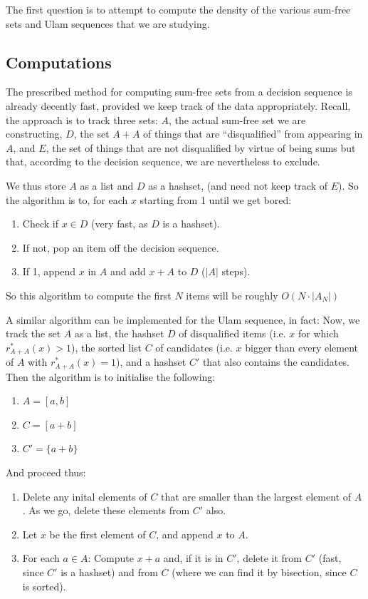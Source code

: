\documentclass{report}
\theoremstyle{remark}
\numberwithin{equation}{section}
\begin{document}
The first question is to attempt to compute the density of the various
sum-free sets and Ulam sequences that we are studying.  

\subsection{Computations}

The prescribed method for computing sum-free sets from a decision
sequence is already decently fast, provided we keep track of the data
appropriately.  Recall, the approach is to track three sets: $A$, the
actual sum-free set we are constructing, $D$, the set $A+A$ of things
that are ``disqualified'' from appearing in $A$, and $E$, the set of
things that are not disqualified by virtue of being sums but that,
according to the decision sequence, we are nevertheless to exclude.

We thus store $A$ as a list and $D$ as a hashset, (and need not keep
track of $E$).  So the algorithm is to, for each $x$ starting from 1
until we get bored:

\begin{enumerate}
\item Check if $x \in D$ (very fast, as $D$ is a hashset).  
\item If not, pop an item off the decision sequence.  
\item If 1, append $x$ in $A$ and add $x + A$ to $D$ ($|A|$ steps).
\end{enumerate}

So this algorithm to compute the first $N$ items will be roughly
$O(N \cdot |A_N|)$

A similar algorithm can be implemented for the Ulam sequence, in fact:
Now, we track the set $A$ as a list, the hashset $D$ of disqualified
items (i.e. $x$ for which $r^*_{A+A}(x) > 1$), the sorted list $C$ of
candidates (i.e. $x$ bigger than every element of $A$ with
$r^*_{A+A}(x) = 1$), and a hashset $C'$ that also contains the candidates.  Then the algorithm is to initialise the
following: 

\begin{enumerate}
\item $A = [a,b]$
\item $C = [a+b]$
\item $C' = \{a+b\}$
\end{enumerate}

And proceed thus: 

\begin{enumerate}
\item Delete any inital elements of $C$ that are smaller than the
  largest element of $A$.  As we go, delete these elements from $C'$
  also.
\item Let $x$ be the first element of $C$, and append $x$ to $A$.
\item For each $a \in A$: Compute $x + a$ and, if it is in $C'$,
  delete it from $C'$ (fast, since $C'$ is a hashset) and from $C$
  (where we can find it by bisection, since $C$ is sorted).
\end{enumerate}
\end{document}
